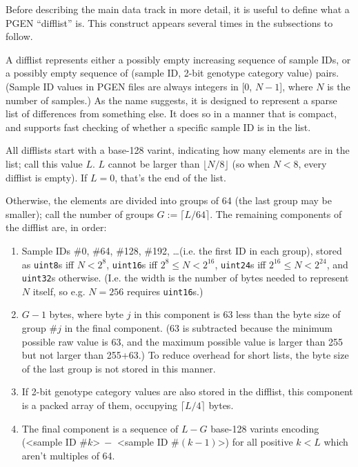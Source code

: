 \documentclass[8pt]{article}
\begin{document}
Before describing the main data track in more detail, it is useful to define
what a PGEN ``difflist'' is.  This construct appears several times in the
subsections to follow.

A difflist represents either a possibly empty increasing sequence of sample
IDs, or a possibly empty sequence of (sample ID, 2-bit genotype category value)
pairs.  (Sample ID values in PGEN files are always integers in [0, $N-1$],
where $N$ is the number of samples.)  As the name suggests, it is designed to
represent a sparse list of differences from something else.  It does so in a
manner that is compact, and supports fast checking of whether a specific sample
ID is in the list.

All difflists start with a base-128 varint, indicating how many elements are in
the list; call this value $L$.  $L$ cannot be larger than $\lfloor N/8\rfloor
$ (so when $N<8$, every difflist is empty).  If $L=0$, that's the end of the
list.

Otherwise, the elements are divided into groups of 64 (the last group may be
smaller); call the number of groups $G:=\lceil L/64\rceil $.  The remaining
components of the difflist are, in order:

\begin{enumerate}
\item Sample IDs \#0, \#64, \#128, \#192, \ldots (i.e. the first ID in each
  group), stored as \texttt{uint8}s iff $N<2^8$, \texttt{uint16}s iff
  $2^8\leq N<2^{16}$, \texttt{uint24}s iff $2^{16}\leq N<2^{24}$, and
  \texttt{uint32}s otherwise.  (I.e. the width is the number of bytes needed
  to represent $N$ itself, so e.g. $N=256$ requires \texttt{uint16}s.)
\item $G-1$ bytes, where byte $j$ in this component is 63 less than the byte
  size of group \#$j$ in the final component.  (63 is subtracted because the
  minimum possible raw value is 63, and the maximum possible value is larger
  than 255 but not larger than 255+63.)  To reduce overhead for short lists,
  the byte size of the last group is not stored in this manner.
\item If 2-bit genotype category values are also stored in the difflist, this
  component is a packed array of them, occupying $\lceil L/4\rceil $ bytes.
\item The final component is a sequence of $L-G$ base-128 varints encoding
  (\textless sample ID \#$k$\textgreater $\>-$ \textless sample ID
  \#$(k-1)$\textgreater) for all positive $k<L$ which aren't multiples of 64.
\end{enumerate}
\end{document}
